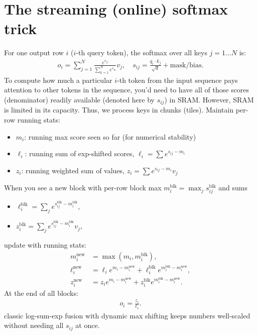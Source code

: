 \section{The streaming (online) softmax trick}


For one output row $i$ ($i$-th query token), the softmax over all keys $j=1\ldots N$ is:
\begin{align*}
	o_i = \sum_{j=1}^N \frac{e^{s_{ij}}}{\sum_{k=1}^N e^{s_{ik}}} v_j,
	\quad s_{ij} = \frac{q_i\cdot k_j}{\sqrt{d}} + \text{mask/bias}.
\end{align*}
To compute how much a particular $i$-th token from the input sequence pays attention to other tokens in the sequence,  you'd need to have all of those scores (\ie denominator) readily available (denoted here by $s_{ij}$) in SRAM. However, SRAM is limited in its capacity. Thus, we process keys in chunks (\ie tiles). Maintain per-row running stats:

\begin{itemize}
	\item $m_i$: running max score seen so far (for numerical stability)
	\item $\ell_i$: running sum of exp-shifted scores, \ie $\ell_i = \sum e^{s_{ij}-m_i}$
	\item $z_i$: running weighted sum of values, $z_i = \sum e^{s_{ij}-m_i} v_j$
\end{itemize}
When you see a new block with per-row block max $m_i^{\text{blk}}=\max_j s_{ij}^{\text{blk}}$ and sums
\begin{itemize}
	\item $\ell_i^{\text{blk}} = \sum_j e^{s_{ij}^{\text{blk}}-m_i^{\text{blk}}},$
	\item $z_i^{\text{blk}} = \sum_j e^{s_{ij}^{\text{blk}}-m_i^{\text{blk}}} v_j,$
\end{itemize}
update with running stats:
\begin{align*}
	m_i^{\text{new}} &= \max(m_i, m_i^{\text{blk}}),\\
	\ell_i^{\text{new}} &= \ell_i e^{m_i - m_i^{\text{new}}}
	+
	\ell_i^{\text{blk}} e^{m_i^{\text{blk}} - m_i^{\text{new}}},\\
	z_i^{\text{new}} &= z_i e^{m_i - m_i^{\text{new}}}
	+
	z_i^{\text{blk}} e^{m_i^{\text{blk}} - m_i^{\text{new}}}.
\end{align*}
At the end of all blocks:
\begin{align*}
	o_i = \frac{z_i}{\ell_i}.
\end{align*}
classic log-sum-exp fusion with dynamic max shifting keeps numbers well-scaled without needing all $s_{ij}$ at once.


